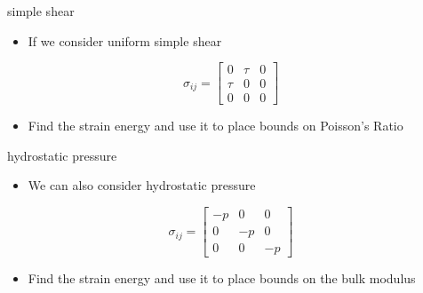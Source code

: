 \documentclass[
  letterpaper,
  ignorenonframetext,
  aspectratio=43,
  handout,
  12pt]{beamer}
\providecommand{\tightlist}{%
  \setlength{\itemsep}{0pt}\setlength{\parskip}{0pt}}
\providecommand{\tightlist}{%
\setlength{\itemsep}{0pt}\setlength{\parskip}{0pt}}
\begin{document}
\begin{frame}{simple shear}
\protect\hypertarget{simple-shear}{}
\begin{itemize}
\tightlist
\item
  If we consider uniform simple shear
\end{itemize}

\[\sigma_{ij} = \begin{bmatrix}
    0 & \tau & 0 \\
    \tau & 0 & 0\\
    0 & 0 & 0
\end{bmatrix}\]

\begin{itemize}
\tightlist
\item
  Find the strain energy and use it to place bounds on Poisson's Ratio
\end{itemize}
\end{frame}

\begin{frame}{hydrostatic pressure}
\protect\hypertarget{hydrostatic-pressure}{}
\begin{itemize}
\tightlist
\item
  We can also consider hydrostatic pressure
\end{itemize}

\[\sigma_{ij} = \begin{bmatrix}
    -p & 0 & 0 \\
    0 & -p & 0\\
    0 & 0 & -p
\end{bmatrix}\]

\begin{itemize}
\tightlist
\item
  Find the strain energy and use it to place bounds on the bulk modulus
\end{itemize}
\end{frame}
\end{document}
